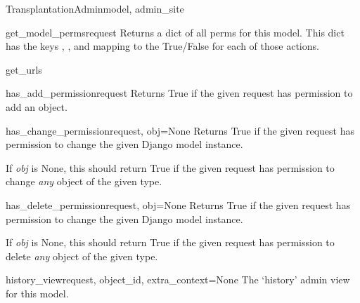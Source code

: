 \documentclass[letterpaper,10pt,english]{sphinxmanual}
\begin{document}
\begin{classdesc}{TransplantationAdmin}{model, admin\_site}
\hypertarget{data.admin.TransplantationAdmin.get_model_perms}{}\begin{methoddesc}{get\_model\_perms}{request}
Returns a dict of all perms for this model. This dict has the keys
, , and  mapping to the True/False for each
of those actions.
\end{methoddesc}

\hypertarget{data.admin.TransplantationAdmin.get_urls}{}\begin{methoddesc}{get\_urls}{}\end{methoddesc}

\hypertarget{data.admin.TransplantationAdmin.has_add_permission}{}\begin{methoddesc}{has\_add\_permission}{request}
Returns True if the given request has permission to add an object.
\end{methoddesc}

\hypertarget{data.admin.TransplantationAdmin.has_change_permission}{}\begin{methoddesc}{has\_change\_permission}{request, obj=None}
Returns True if the given request has permission to change the given
Django model instance.

If \emph{obj} is None, this should return True if the given request has
permission to change \emph{any} object of the given type.
\end{methoddesc}

\hypertarget{data.admin.TransplantationAdmin.has_delete_permission}{}\begin{methoddesc}{has\_delete\_permission}{request, obj=None}
Returns True if the given request has permission to change the given
Django model instance.

If \emph{obj} is None, this should return True if the given request has
permission to delete \emph{any} object of the given type.
\end{methoddesc}

\hypertarget{data.admin.TransplantationAdmin.history_view}{}\begin{methoddesc}{history\_view}{request, object\_id, extra\_context=None}
The `history' admin view for this model.
\end{methoddesc}


\end{classdesc}
\end{document}
